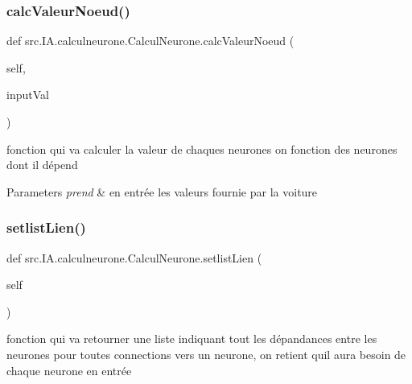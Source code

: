 \subsubsection{\texorpdfstring{calc\+Valeur\+Noeud()}{calcValeurNoeud()}}
{\footnotesize\ttfamily def src.\+I\+A.\+calculneurone.\+Calcul\+Neurone.\+calc\+Valeur\+Noeud (\begin{DoxyParamCaption}\item[{}]{self,  }\item[{}]{input\+Val }\end{DoxyParamCaption})}



fonction qui va calculer la valeur de chaques neurones on fonction des neurones dont il dépend 


\begin{DoxyParams}{Parameters}
{\em prend} & en entrée les valeurs fournie par la voiture \\
\hline
\end{DoxyParams}
\mbox{\label{classsrc_1_1_i_a_1_1calculneurone_1_1_calcul_neurone_a5a2eac40e09b30ac192f13c5486c54ad}} 
\subsubsection{\texorpdfstring{setlist\+Lien()}{setlistLien()}}
{\footnotesize\ttfamily def src.\+I\+A.\+calculneurone.\+Calcul\+Neurone.\+setlist\+Lien (\begin{DoxyParamCaption}\item[{}]{self }\end{DoxyParamCaption})}



fonction qui va retourner une liste indiquant tout les dépandances entre les neurones pour toutes connections vers un neurone, on retient qu\textquotesingle{}il aura besoin de chaque neurone en entrée 

\mbox{\label{classsrc_1_1_i_a_1_1calculneurone_1_1_calcul_neurone_a85f9c2a232514510494df22fad8076f3}} 
